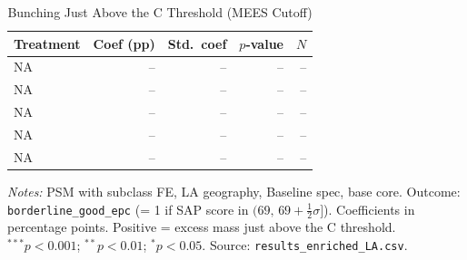 \begin{table}[htbp]
\centering
\caption{Bunching Just Above the C Threshold (MEES Cutoff)}
\label{tab:h3_borderline_good}
\begin{tabular}{lrrrr}
\toprule
Treatment & Coef (pp) & Std.\ coef & $p$-value & $N$ \\
\midrule
NA & -- & -- & -- & -- \\
NA & -- & -- & -- & -- \\
NA & -- & -- & -- & -- \\
NA & -- & -- & -- & -- \\
NA & -- & -- & -- & -- \\
\bottomrule
\end{tabular}
\begin{minipage}{0.9\textwidth}
\vspace{4pt}
\footnotesize
\textit{Notes:} PSM with subclass FE, LA geography, Baseline spec, base core.
Outcome: \texttt{borderline\_good\_epc} (= 1 if SAP score in $(69,\, 69 + \frac{1}{2}\sigma]$).
Coefficients in percentage points. Positive = excess mass just above the C threshold.
$^{***}p<0.001$; $^{**}p<0.01$; $^{*}p<0.05$.
Source: \texttt{results\_enriched\_LA.csv}.
\end{minipage}
\end{table}
